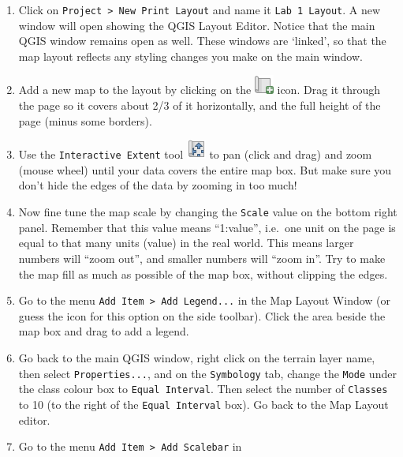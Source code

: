 \documentclass[
  letterpaper,
  DIV=11,
  numbers=noendperiod]{scrreprt}
\begin{document}
\begin{enumerate}
\def\labelenumi{(\arabic{enumi})}
\setcounter{enumi}{34}
\item
  Click on \texttt{Project\ \textgreater{}\ New\ Print\ Layout} and name
  it \texttt{Lab\ 1\ Layout}. A new window will open showing the QGIS
  Layout Editor. Notice that the main QGIS window remains open as well.
  These windows are `linked', so that the map layout reflects any
  styling changes you make on the main window.
\item
  Add a new map to the layout by clicking on the
  \includegraphics{index_files/mediabag/mActionAddMap.png} icon. Drag it
  through the page so it covers about 2/3 of it horizontally, and the
  full height of the page (minus some borders).
\item
  Use the \texttt{Interactive\ Extent} tool
  \includegraphics{index_files/mediabag/mActionMoveItemConte.png} to pan
  (click and drag) and zoom (mouse wheel) until your data covers the
  entire map box. But make sure you don't hide the edges of the data by
  zooming in too much!
\item
  Now fine tune the map scale by changing the \texttt{Scale} value on
  the bottom right panel. Remember that this value means ``1:value'',
  i.e.~one unit on the page is equal to that many units (value) in the
  real world. This means larger numbers will ``zoom out'', and smaller
  numbers will ``zoom in''. Try to make the map fill as much as possible
  of the map box, without clipping the edges.
\item
  Go to the menu \texttt{Add\ Item\ \textgreater{}\ Add\ Legend...} in
  the Map Layout Window (or guess the icon for this option on the side
  toolbar). Click the area beside the map box and drag to add a legend.
\item
  Go back to the main QGIS window, right click on the terrain layer
  name, then select \texttt{Properties...}, and on the
  \texttt{Symbology} tab, change the \texttt{Mode} under the class
  colour box to \texttt{Equal\ Interval}. Then select the number of
  \texttt{Classes} to 10 (to the right of the \texttt{Equal\ Interval}
  box). Go back to the Map Layout editor.
\item
  Go to the menu \texttt{Add\ Item\ \textgreater{}\ Add\ Scalebar} in

\end{enumerate}
\end{document}

